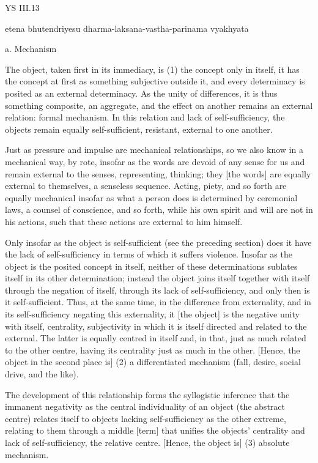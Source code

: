 YS III.13

etena bhutendriyesu dharma-laksana-vastha-parinama vyakhyata

a. Mechanism

The object, taken first in its immediacy, is
(1) the concept only in itself,
it has the concept at first
as something subjective outside it,
and every determinacy is posited
as an external determinacy.
As the unity of differences,
it is thus something composite, an aggregate,
and the effect on another remains
an external relation: formal mechanism.
In this relation and lack of self-sufficiency,
the objects remain equally self-sufficient,
resistant, external to one another.

Just as pressure and impulse are mechanical relationships,
so we also know in a mechanical way, by rote,
insofar as the words are devoid of any sense for us
and remain external to the senses, representing, thinking;
they [the words] are equally external to themselves,
a senseless sequence.
Acting, piety, and so forth are equally mechanical
insofar as what a person does is determined by
ceremonial laws, a counsel of conscience, and so forth,
while his own spirit and will are not in his actions,
such that these actions are external to him himself.

Only insofar as the object is self-sufficient
(see the preceding section)
does it have the lack of self-sufficiency
in terms of which it suffers violence.
Insofar as the object is the posited concept in itself,
neither of these determinations sublates itself
in its other determination;
instead the object joins itself together with itself
through the negation of itself,
through its lack of self-sufficiency,
and only then is it self-sufficient.
Thus, at the same time, in the difference from externality,
and in its self-sufficiency negating this externality,
it [the object] is the negative unity with itself, centrality,
subjectivity in which it is itself directed and related to the external.
The latter is equally centred in itself
and, in that, just as much related
to the other centre,
having its centrality just as much in the other.
[Hence, the object in the second place is]
(2) a differentiated mechanism
(fall, desire, social drive, and the like).

The development of this relationship
forms the syllogistic inference
that the immanent negativity
as the central individuality of an object (the abstract centre)
relates itself to objects lacking self-sufficiency
as the other extreme,
relating to them through a middle [term]
that unifies the objects' centrality
and lack of self-sufficiency,
the relative centre.
[Hence, the object is]
(3) absolute mechanism.

